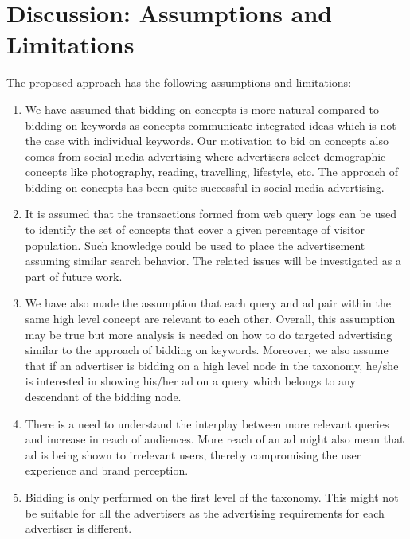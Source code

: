 \section{Discussion: Assumptions and Limitations}

\label{Ch4Discussion}

The proposed approach has the following assumptions and limitations:

\begin{enumerate}[label=(\roman*).]

\item We have assumed that bidding on concepts is more natural compared to bidding on keywords as concepts communicate integrated ideas which is not the case with individual keywords. Our motivation to bid on concepts also comes from social media advertising where advertisers select demographic concepts like photography, reading, travelling, lifestyle, etc. The approach of bidding on concepts has been quite successful in social media advertising. 

\item It is assumed that the transactions formed from web query logs can be used to identify the set of concepts that cover a given percentage of visitor population. Such knowledge could be used to place the advertisement assuming similar search behavior. The related issues will be
investigated as a part of future work.

\item We have also made the assumption that each query and ad pair within the same high level concept are relevant to each other. Overall, this assumption may be true but more analysis is needed on how to do targeted advertising similar to the approach of bidding on keywords. Moreover, we also assume that if an advertiser is bidding on a high level node in the taxonomy, he/she is interested in showing his/her ad on a query which belongs to any descendant of the bidding node.

\item There is a need to understand the interplay between more relevant queries and increase in reach of audiences. More reach of an ad might also mean that ad is being shown to irrelevant users, thereby compromising the user experience and brand perception.

\item Bidding is only performed on the first level of the taxonomy. This might not be suitable for all the advertisers as the advertising requirements for each advertiser is different.

\end{enumerate}







